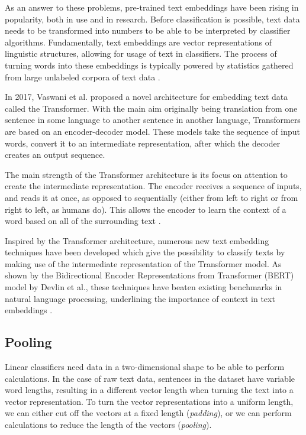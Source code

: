 As an answer to these problems, pre-trained text embeddings have been rising in popularity, both in use and in research.
Before classification is possible, text data needs to be transformed into numbers to be able to be interpreted by classifier algorithms.
Fundamentally, text embeddings are vector representations of linguistic structures, allowing for usage of text in classifiers. 
The process of turning words into these embeddings is typically powered by statistics gathered from large unlabeled corpora of text data \cite{mikolov2017}.

In 2017, Vaswani et al. proposed a novel architecture for embedding text data called the Transformer. 
With the main aim originally being translation from one sentence in some language to another sentence in another language, Transformers are based on an encoder-decoder model.
These models take the sequence of input words, convert it to an intermediate representation, after which the decoder creates an output sequence.

The main strength of the Transformer architecture is its focus on attention to create the intermediate representation.
The encoder receives a sequence of inputs, and reads it at once, as opposed to sequentially (either from left to right or from right to left, as humans do). 
This allows the encoder to learn the context of a word based on all of the surrounding text \cite{vaswani2017}.

Inspired by the Transformer architecture, numerous new text embedding techniques have been developed which give the possibility to classify texts by making use of the intermediate representation of the Transformer model.
As shown by the Bidirectional Encoder Representations from Transformer (BERT) model by Devlin et al., these techniques have beaten existing benchmarks in natural language processing, underlining the importance of context in text embeddings \cite{devlin2018}. 

\subsection{Pooling}
Linear classifiers need data in a two-dimensional shape to be able to perform calculations. 
In the case of raw text data, sentences in the dataset have variable word lengths, resulting in a different vector length when turning the text into a vector representation.
To turn the vector representations into a uniform length, we can either cut off the vectors at a fixed length (\textit{padding}), or we can perform calculations to reduce the length of the vectors (\textit{pooling}).

